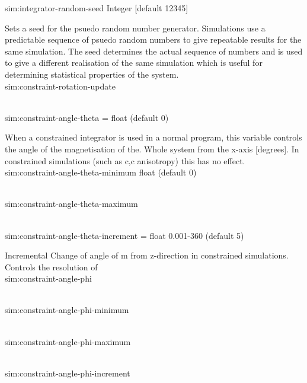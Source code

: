 {\zicf sim:integrator-random-seed
    Integer [default 12345]}
    Sets a seed for the psuedo random number generator. Simulations use a predictable sequence of psuedo random numbers to give repeatable results for the same simulation. The seed determines the actual sequence of numbers and is used to give a different realisation of the same simulation which is useful for determining statistical properties of the system.\\

{\zicf sim:constraint-rotation-update}\\

{\zicf sim:constraint-angle-theta = float (default 0)}
    When a constrained integrator is used in a normal program, this variable controls the angle of the magnetisation of the. Whole system from the x-axis [degrees]. In constrained simulations (such as c,c anisotropy) this has no effect.\\

{\zicf  sim:constraint-angle-theta-minimum float (default 0)}\\

{\zicf  sim:constraint-angle-theta-maximum}\\

{\zicf  sim:constraint-angle-theta-increment = float 0.001-360 (default 5)}
    Incremental Change of angle of m from z-direction in constrained simulations. Controls the resolution of \\

{\zicf sim:constraint-angle-phi}\\

{\zicf sim:constraint-angle-phi-minimum}\\

{\zicf sim:constraint-angle-phi-maximum}\\

{\zicf sim:constraint-angle-phi-increment}\\

